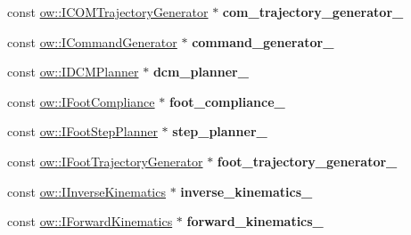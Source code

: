 \begin{DoxyCompactItemize}
\item 
const \hyperlink{classow_1_1ICOMTrajectoryGenerator}{ow\+::\+I\+C\+O\+M\+Trajectory\+Generator} $\ast$ {\bfseries com\+\_\+trajectory\+\_\+generator\+\_\+}\hypertarget{classow__pub_1_1StatePublisher_acf22f79737d1c51df051d2cc3151f7f7}{}\label{classow__pub_1_1StatePublisher_acf22f79737d1c51df051d2cc3151f7f7}

\item 
const \hyperlink{classow_1_1ICommandGenerator}{ow\+::\+I\+Command\+Generator} $\ast$ {\bfseries command\+\_\+generator\+\_\+}\hypertarget{classow__pub_1_1StatePublisher_ac4bb78c9c4aafc8cb65d710bc00e25eb}{}\label{classow__pub_1_1StatePublisher_ac4bb78c9c4aafc8cb65d710bc00e25eb}

\item 
const \hyperlink{classow_1_1IDCMPlanner}{ow\+::\+I\+D\+C\+M\+Planner} $\ast$ {\bfseries dcm\+\_\+planner\+\_\+}\hypertarget{classow__pub_1_1StatePublisher_ac5a4f51a8074341c8c55f95f84c6d960}{}\label{classow__pub_1_1StatePublisher_ac5a4f51a8074341c8c55f95f84c6d960}

\item 
const \hyperlink{classow_1_1IFootCompliance}{ow\+::\+I\+Foot\+Compliance} $\ast$ {\bfseries foot\+\_\+compliance\+\_\+}\hypertarget{classow__pub_1_1StatePublisher_a61a75d5a05b4fbcc8e51d5f222329097}{}\label{classow__pub_1_1StatePublisher_a61a75d5a05b4fbcc8e51d5f222329097}

\item 
const \hyperlink{classow_1_1IFootStepPlanner}{ow\+::\+I\+Foot\+Step\+Planner} $\ast$ {\bfseries step\+\_\+planner\+\_\+}\hypertarget{classow__pub_1_1StatePublisher_ab140211a1f98ac673621e3cd88f74f92}{}\label{classow__pub_1_1StatePublisher_ab140211a1f98ac673621e3cd88f74f92}

\item 
const \hyperlink{classow_1_1IFootTrajectoryGenerator}{ow\+::\+I\+Foot\+Trajectory\+Generator} $\ast$ {\bfseries foot\+\_\+trajectory\+\_\+generator\+\_\+}\hypertarget{classow__pub_1_1StatePublisher_a30071d079a9a8778554000c54dc33aa9}{}\label{classow__pub_1_1StatePublisher_a30071d079a9a8778554000c54dc33aa9}

\item 
const \hyperlink{classow_1_1IInverseKinematics}{ow\+::\+I\+Inverse\+Kinematics} $\ast$ {\bfseries inverse\+\_\+kinematics\+\_\+}\hypertarget{classow__pub_1_1StatePublisher_a423dcb9acc40596027b06c8be5ed768a}{}\label{classow__pub_1_1StatePublisher_a423dcb9acc40596027b06c8be5ed768a}

\item 
const \hyperlink{classow_1_1IForwardKinematics}{ow\+::\+I\+Forward\+Kinematics} $\ast$ {\bfseries forward\+\_\+kinematics\+\_\+}\hypertarget{classow__pub_1_1StatePublisher_a0317425729aedcad166baa6c2ceda092}{}\label{classow__pub_1_1StatePublisher_a0317425729aedcad166baa6c2ceda092}


\end{DoxyCompactItemize}
